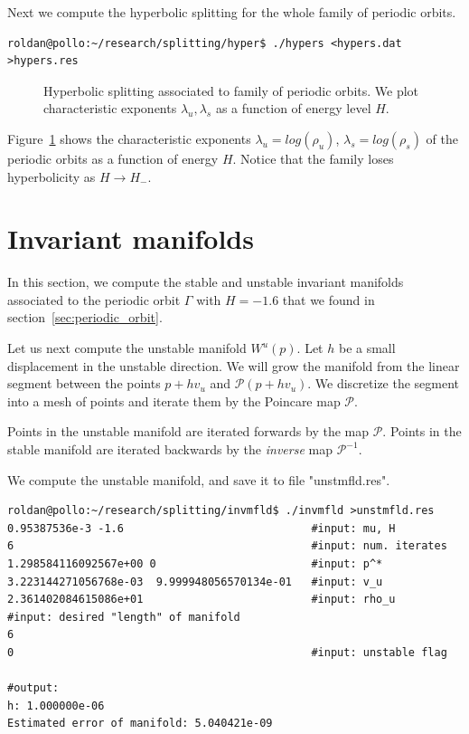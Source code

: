 \documentclass[a4paper]{amsart}
\theoremstyle{remark}
\newtheorem{rem}[thm]{Remark}
\newcommand{\sixmap}{\mathcal{P}}
\begin{document}
Next we compute the hyperbolic splitting for the whole family of
periodic orbits.

\begin{verbatim}
roldan@pollo:~/research/splitting/hyper$ ./hypers <hypers.dat
>hypers.res
\end{verbatim}

\begin{figure}
\caption{Hyperbolic splitting associated to family of periodic orbits. 
We plot characteristic exponents $\lambda_u, \lambda_s$ as a function
of energy level $H$.}
\label{fig:hypers}
\end{figure}

Figure~\ref{fig:hypers} shows the characteristic exponents
$\lambda_u=log(\rho_u)$, $\lambda_s=log(\rho_s)$ of the periodic
orbits as a function of energy $H$.
Notice that the family loses hyperbolicity as $H\to H_-$.

\section{Invariant manifolds}\label{sec:invariant_manifolds}

In this section, we compute the stable and unstable invariant manifolds
associated to the periodic orbit $\Gamma$ with $H=-1.6$ that we found
in section~\ref{sec:periodic_orbit}.

Let us next compute the unstable manifold $W^u(p)$. 
Let $h$ be a small displacement in the unstable direction.
We will grow the manifold from the linear segment between the points $p+hv_u$
and $\sixmap(p+hv_u)$. We discretize the segment into a mesh of points and iterate
them by the Poincare map $\sixmap$.

 
Points in the unstable manifold are iterated forwards by the map $\sixmap$.
Points in the stable manifold are iterated backwards by the \emph{inverse} 
map $\sixmap^{-1}$.

We compute the unstable manifold, and save it to file "unstmfld.res".

\begin{verbatim}
roldan@pollo:~/research/splitting/invmfld$ ./invmfld >unstmfld.res
0.95387536e-3 -1.6                             #input: mu, H
6                                              #input: num. iterates
1.298584116092567e+00 0                        #input: p^*
3.223144271056768e-03  9.999948056570134e-01   #input: v_u
2.361402084615086e+01                          #input: rho_u
#input: desired "length" of manifold
6
0                                              #input: unstable flag

#output:
h: 1.000000e-06
Estimated error of manifold: 5.040421e-09
\end{verbatim}
\end{document}
